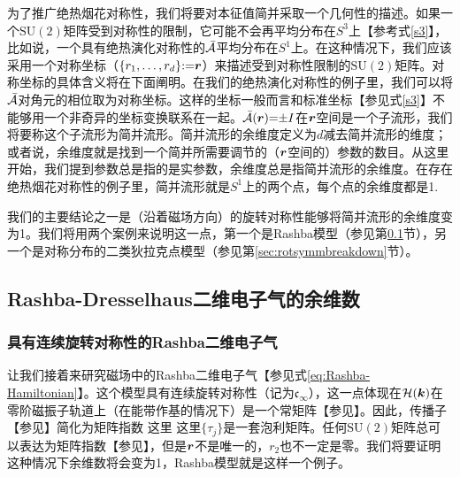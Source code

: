 为了推广绝热烟花对称性，我们将要对本征值简并采取一个几何性的描述。如果一个$\text{SU}(2)$矩阵受到对称性的限制，它可能不会再平均分布在$S^3$上【参考式\ref{s3}】，比如说，一个具有绝热演化对称性的${\cal \bar{A}}$平均分布在$S^1$上。在这种情况下，我们应该采用一个对称坐标（$\{r_1,\ldots,r_{d}\}{:}{=}\boldsymbol{r}$）来描述受到对称性限制的$\text{SU}(2)$矩阵。对称坐标的具体含义将在下面阐明。在我们的绝热演化对称性的例子里，我们可以将${\cal \bar{A}}$对角元的相位取为对称坐标。这样的坐标一般而言和标准坐标【参见式\ref{s3}】不能够用一个非奇异的坐标变换联系在一起。${\cal \bar{A}}(\boldsymbol{r}){=}{\pm}I$在$\boldsymbol{r}$空间是一个子流形，我们将要称这个子流形为简并流形。简并流形的余维度定义为$d$减去简并流形的维度；或者说，余维度就是找到一个简并所需要调节的（$\boldsymbol{r}$空间的）参数的数目。从这里开始，我们提到参数总是指的是实参数，余维度总是指简并流形的余维度。在存在绝热烟花对称性的例子里，简并流形就是$S^1$上的两个点，每个点的余维度都是1.

我们的主要结论之一是（沿着磁场方向）的旋转对称性能够将简并流形的余维度变为1。我们将用两个案例来说明这一点，第一个是Rashba模型（参见第\ref{sec:singleparameterrashba}节），另一个是对称分布的二类狄拉克点模型（参见第\ref{sec:rotsymmbreakdown}节）。

\subsection{Rashba-Dresselhaus二维电子气的余维数}\label{sec:singleparameterrashba}

\subsubsection{具有连续旋转对称性的Rashba二维电子气}\label{sec:ctsrot}

让我们接着来研究磁场中的Rashba二维电子气【参见式\ref{eq:Rashba-Hamiltonian}】。这个模型具有连续旋转对称性（记为$\mathfrak{c}_{\infty}$），这一点体现在${\cal H}(\boldsymbol{k})$在零阶磁振子轨道上（在能带作基的情况下）是一个常矩阵【参见】。因此，传播子【参见】简化为矩阵指数
这里
这里$\{\tau_j\}$是一套泡利矩阵。任何$\text{SU}(2)$矩阵总可以表达为矩阵指数【参见】，但是$\boldsymbol{r}$不是唯一的，$r_2$也不一定是零。我们将要证明这种情况下余维数将会变为1，Rashba模型就是这样一个例子。


